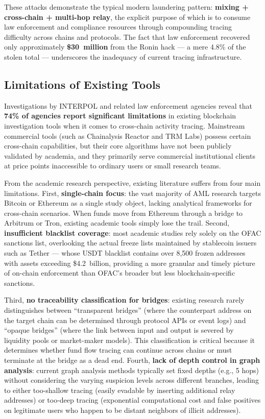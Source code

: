\documentclass[12pt,a4paper]{article}
\begin{document}
These attacks demonstrate the typical modern laundering pattern: \textbf{mixing + cross-chain + multi-hop relay}, the explicit purpose of which is to consume law enforcement and compliance resources through compounding tracing difficulty across chains and protocols. The fact that law enforcement recovered only approximately \textbf{\$30~million} from the Ronin hack --- a mere 4.8\% of the stolen total --- underscores the inadequacy of current tracing infrastructure.

\subsection{Limitations of Existing Tools}

Investigations by INTERPOL and related law enforcement agencies reveal that \textbf{74\% of agencies report significant limitations} in existing blockchain investigation tools when it comes to cross-chain activity tracing. Mainstream commercial tools (such as Chainalysis Reactor and TRM Labs) possess certain cross-chain capabilities, but their core algorithms have not been publicly validated by academia, and they primarily serve commercial institutional clients at price points inaccessible to ordinary users or small research teams.

From the academic research perspective, existing literature suffers from four main limitations. First, \textbf{single-chain focus}: the vast majority of AML research targets Bitcoin or Ethereum as a single study object, lacking analytical frameworks for cross-chain scenarios. When funds move from Ethereum through a bridge to Arbitrum or Tron, existing academic tools simply lose the trail. Second, \textbf{insufficient blacklist coverage}: most academic studies rely solely on the OFAC sanctions list, overlooking the actual freeze lists maintained by stablecoin issuers such as Tether --- whose USDT blacklist contains over 8,500 frozen addresses with assets exceeding \$4.2~billion, providing a more granular and timely picture of on-chain enforcement than OFAC's broader but less blockchain-specific sanctions.

Third, \textbf{no traceability classification for bridges}: existing research rarely distinguishes between ``transparent bridges'' (where the counterpart address on the target chain can be determined through protocol APIs or event logs) and ``opaque bridges'' (where the link between input and output is severed by liquidity pools or market-maker models). This classification is critical because it determines whether fund flow tracing can continue across chains or must terminate at the bridge as a dead end. Fourth, \textbf{lack of depth control in graph analysis}: current graph analysis methods typically set fixed depths (e.g., 5 hops) without considering the varying suspicion levels across different branches, leading to either too-shallow tracing (easily evadable by inserting additional relay addresses) or too-deep tracing (exponential computational cost and false positives on legitimate users who happen to be distant neighbors of illicit addresses).
\end{document}
